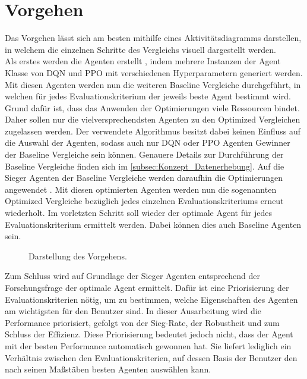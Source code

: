 \section{Vorgehen} \label{sec:Konzept_Vorgehen}
Das Vorgehen lässt sich am besten mithilfe eines Aktivitätsdiagramms darstellen, in welchem die einzelnen Schritte des Vergleichs visuell dargestellt werden.\\
Als erstes werden die Agenten erstellt , indem mehrere Instanzen der Agent Klasse von DQN und PPO mit verschiedenen Hyperparametern generiert werden.\\
Mit diesen Agenten werden nun die weiteren Baseline Vergleiche durchgeführt, in welchen für jedes Evaluationskriterium der jeweils beste Agent bestimmt wird. Grund dafür ist, dass das Anwenden der Optimierungen viele Ressourcen bindet. Daher sollen nur die vielversprechendsten Agenten zu den Optimized Vergleichen zugelassen werden.
Der verwendete Algorithmus besitzt dabei keinen Einfluss auf die Auswahl der Agenten, sodass auch nur DQN oder PPO Agenten Gewinner der Baseline Vergleiche sein können. Genauere Details zur Durchführung der Baseline Vergleiche finden sich im \autoref{subsec:Konzept_Datenerhebung}.
Auf die Sieger Agenten der Baseline Vergleiche werden daraufhin die Optimierungen angewendet . 
Mit diesen optimierten Agenten werden nun die sogenannten Optimized Vergleiche bezüglich jedes einzelnen Evaluationskriteriums  erneut wiederholt. Im vorletzten Schritt soll wieder der optimale Agent für jedes Evaluationskriterium ermittelt werden. Dabei können dies auch Baseline Agenten sein.
\begin{figure}[H]
	\centering
	
	\caption[Aktivitätsdiagramm des Vorgehens]{Darstellung des Vorgehens.}
	\label{fig:Konzept_Vorgehen}
\end{figure}
Zum Schluss wird auf Grundlage der Sieger Agenten entsprechend der Forschungsfrage der optimale Agent ermittelt. Dafür ist eine Priorisierung der Evaluationskriterien nötig, um zu bestimmen, welche Eigenschaften des Agenten am wichtigsten für den Benutzer sind. In dieser Ausarbeitung wird die Performance priorisiert, gefolgt von der Sieg-Rate, der Robustheit und zum Schluss der Effizienz. Diese Priorisierung bedeutet jedoch nicht, dass der Agent mit der besten Performance automatisch gewonnen hat. Sie liefert lediglich ein Verhältnis zwischen den Evaluationskriterien, auf dessen Basis der Benutzer den nach seinen Maßstäben besten Agenten auswählen kann.

